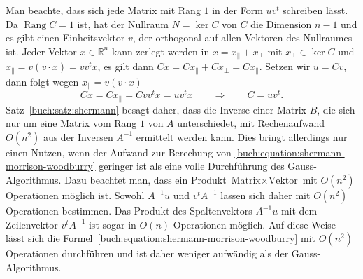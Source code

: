 Man beachte, dass sich jede Matrix mit Rang $1$ in der Form $uv^t$
schreiben lässt.
Da $\operatorname{Rang}C=1$ ist, hat der Nullraum $N=\operatorname{ker}C$
von $C$ die Dimension $n-1$ und es gibt einen Einheitsvektor $v$,
der orthogonal auf allen Vektoren des Nullraumes ist.
Jeder Vektor $x\in \mathbb R^n$ kann zerlegt werden in
$x=x_{\|} + x_{\perp}$ mit $x_{\perp}\in\operatorname{ker}C$ und
$x_{\|}=v(v\cdot x)=v v^tx$, es gilt dann
$Cx = Cx_{\|} + Cx_{\perp} = Cx_{\|}$.
Setzen wir $u=Cv$, dann folgt wegen $x_{\|} = v(v\cdot x)$ 
\[
Cx = Cx_{\|} = Cv v^t x = uv^t x
\qquad\Rightarrow\qquad
C = uv^t.
\]
Satz~\ref{buch:satz:shermann} besagt daher, dass die Inverse einer
Matrix $B$, die sich nur um eine Matrix vom Rang $1$ von $A$ unterschiedet,
mit Rechenaufwand $O(n^2)$ aus der Inversen $A^{-1}$ ermittelt werden kann.
Dies bringt allerdings nur einen Nutzen, wenn der Aufwand zur Berechung
von \eqref{buch:equation:shermann-morrison-woodburry} geringer ist als
eine volle Durchführung des Gauss-Algorithmus.
%
Dazu beachtet man, dass ein Produkt $\text{Matrix}\times\text{Vektor}$ 
mit $O(n^2)$ Operationen möglich ist.
Sowohl $A^{-1}u$ und $v^tA^{-1}$ lassen sich daher mit $O(n^2)$
Operationen bestimmen.
Das Produkt des Spaltenvektors $A^{-1}u$ mit dem Zeilenvektor $v^tA^{-1}$
ist sogar in $O(n)$ Operationen möglich.
%
%
Auf diese Weise lässt sich
die Formel~\ref{buch:equation:shermann-morrison-woodburry} mit
$O(n^2)$ Operationen durchführen und ist daher weniger aufwändig als
der Gauss-Algorithmus.
 

